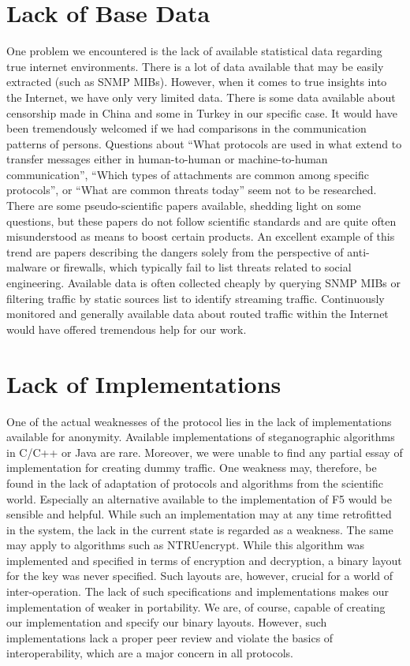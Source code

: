 \section{Lack of Base Data}

One problem we encountered is the lack of available statistical data regarding true internet environments. There is a lot of data available that may be easily extracted (such as SNMP MIBs). However, when it comes to true insights into the Internet, we have only very limited data. There is some data available about censorship made in China and some in Turkey in our specific case. It would have been tremendously welcomed if we had comparisons in the communication patterns of persons. Questions about ``What protocols are used in what extend to transfer messages either in human-to-human or machine-to-human communication'', ``Which types of attachments are common among specific protocols'', or ``What are common threats today'' seem not to be researched. There are some pseudo-scientific papers available, shedding light on some questions, but these papers do not follow scientific standards and are quite often misunderstood as means to boost certain products. An excellent example of this trend are papers describing the dangers solely from the perspective of anti-malware or firewalls, which typically fail to list threats related to social engineering. Available data is often collected cheaply by querying SNMP MIBs or filtering traffic by static sources list to identify streaming traffic. Continuously monitored and generally available data about routed traffic within the Internet would have offered tremendous help for our work.

\section{Lack of Implementations}
One of the actual weaknesses of the protocol lies in the lack of implementations available for anonymity. Available implementations of steganographic algorithms in C/C++ or Java are rare. Moreover, we were unable to find any partial essay of implementation for creating dummy traffic. One weakness may, therefore, be found in the lack of adaptation of protocols and algorithms from the scientific world. Especially an alternative available to the implementation of F5 would be sensible and helpful. While such an implementation may at any time retrofitted in the system, the lack in the current state is regarded as a weakness. The same may apply to algorithms such as NTRUencrypt. While this algorithm was implemented and specified in terms of encryption and decryption, a binary layout for the key was never specified. Such layouts are, however, crucial for a world of inter-operation. The lack of such specifications and implementations makes our implementation of \MessageVortex{} weaker in portability. We are, of course, capable of creating our implementation and specify our binary layouts. However, such implementations lack a proper peer review and violate the basics of interoperability, which are a major concern in all protocols. 

